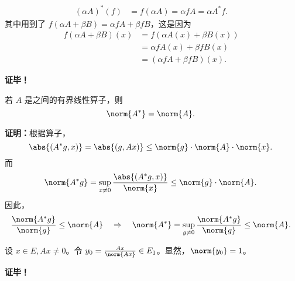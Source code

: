 \begin{equation}
\begin{aligned}
(\alpha A)^*(f)&=f(\alpha A)=\alpha fA=\alpha A^*f.
\end{aligned}~
\end{equation}
其中用到了 $f(\alpha A+\beta B)=\alpha fA+\beta fB$，这是因为
\begin{equation}
\begin{aligned}
f(\alpha A+\beta B)(x)&=f(\alpha A(x)+\beta B(x))\\
&=\alpha fA(x)+\beta fB(x)\\
&=(\alpha fA+\beta fB)(x).
\end{aligned}~
\end{equation}

\textbf{证毕！}



\begin{theorem}{}
若 $A$ 是之间的有界线性算子，则
\begin{equation}
\norm{A^*}=\norm{A}.~
\end{equation}

\end{theorem}

\textbf{证明：}根据算子，
\begin{equation}
\abs{(A^*g,x)}=\abs{(g,Ax)}\leq\norm{g}\cdot\norm{A}\cdot\norm{x}.~
\end{equation}
而 
\begin{equation}
\norm{A^*g}=\sup_{x\neq0} \frac{\abs{(A^*g,x)}}{\norm{x}}\leq\norm{g}\cdot\norm{A}.~
\end{equation}
因此，
\begin{equation}
\frac{\norm{A^*g}}{\norm{g}}\leq\norm{A}\quad\Rightarrow\quad \norm{A^*}=\sup_{g\neq0}\frac{\norm{A^*g}}{\norm{g}}\leq\norm{A}.~
\end{equation}

设 $x\in E,Ax\neq0$。令 $y_0=\frac{Ax}{\norm{Ax}}\in E_1$。显然，$\norm{y_0}=1$。

\textbf{证毕！}


